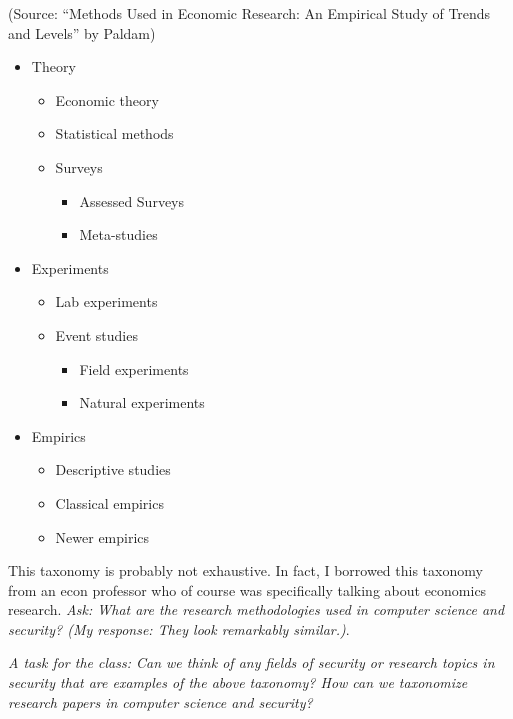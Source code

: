 \documentclass[11pt]{article}
\begin{document}
(Source: ``Methods Used in Economic Research: An Empirical Study of Trends and Levels'' by Paldam)

\begin{itemize}
    \item Theory
        \begin{itemize}
            \item Economic theory
            \item Statistical methods
            \item Surveys
                \begin{itemize}
                    \item Assessed Surveys
                    \item Meta-studies
                \end{itemize}
        \end{itemize}
    \item Experiments
        \begin{itemize}
            \item Lab experiments
            \item Event studies
                \begin{itemize}
                    \item Field experiments
                    \item Natural experiments
                \end{itemize}
        \end{itemize}
    \item Empirics
        \begin{itemize}
            \item Descriptive studies
            \item Classical empirics
            \item Newer empirics
        \end{itemize}
\end{itemize}


This taxonomy is probably not exhaustive. In fact, I borrowed this taxonomy from an econ professor who of course was specifically talking about economics research. {\it Ask: What are the research methodologies used in computer science and security? (My response: They look remarkably similar.)}.

{\it A task for the class: Can we think of any fields of security or research topics in security that are examples of the above taxonomy? How can we taxonomize research papers in computer science and security?}
\end{document}
